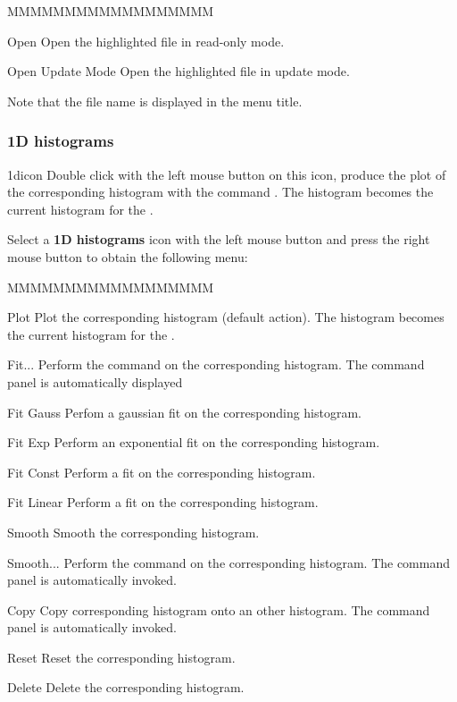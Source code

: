 
\begin{DLsf}{MMMMMMMMMMMMMMMMMM}
\item[Open]              Open the highlighted \HBOOK{} file in read-only mode.
\item[Open Update Mode]  Open the highlighted \HBOOK{} file in update mode.
\end{DLsf}

Note that the \HBOOK{} file name is displayed in the menu title.


\subsubsection{1D histograms}
\begin{ICON}{1dicon}
Double click with the left mouse button on this icon, produce the plot of the
corresponding histogram with the command  . The histogram
becomes the current histogram for the \HSP.
\end{ICON}

Select a {\bf 1D histograms} icon with the left mouse button and press
the right mouse button to obtain the following menu:


\begin{DLsf}{MMMMMMMMMMMMMMMMMM}
\item[Plot]         Plot the corresponding histogram (default action). The
                    histogram becomes the current histogram for the \HSP.
\item[Fit...]       Perform the command  on the corresponding
                    histogram. The command panel is automatically displayed
\item[Fit Gauss]    Perfom a gaussian fit on the corresponding histogram.
\item[Fit Exp]      Perform an exponential fit on the corresponding histogram.
\item[Fit Const]    Perform a  fit on the corresponding histogram.
\item[Fit Linear]   Perform a  fit on the corresponding histogram.
\item[Smooth]       Smooth the corresponding histogram.
\item[Smooth...]    Perform the command  on the corresponding
                    histogram. The command panel is automatically invoked.
\item[Copy ]        Copy corresponding histogram onto an other histogram.
                    The command panel is automatically invoked.
\item[Reset ]       Reset the corresponding histogram.
\item[Delete]       Delete the corresponding histogram.
\end{DLsf}

